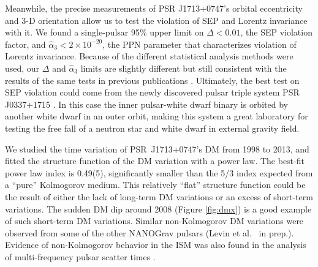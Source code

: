 
Meanwhile, the precise measurements of PSR J1713+0747's orbital eccentricity and
3-D orientation allow us to test the violation of SEP and 
Lorentz invariance with it. We found a single-pulsar 95\% upper limit on 
$\Delta <0.01$, the SEP violation factor, and
$\hat{\alpha}_3<2\times10^{-20}$, the PPN parameter that characterizes
violation of Lorentz invariance. 
Because of the different statistical analysis methods were used, our 
$\Delta$ and $\hat{\alpha}_3$ limits  are slightly
different but still consistent with the results of the same tests in previous publications 
\citep{wex00, sns+05, sfl+05, gsf+11}.
Ultimately, the best test on SEP violation could come from the newly
discovered pulsar triple system PSR J0337+1715 \citep{rsa+14}. In this case 
the inner pulsar-white dwarf binary is orbited by another white dwarf in an
outer orbit, making this system a great laboratory for testing
the free fall of a neutron star and white dwarf in external gravity field.

We studied the time variation of PSR~J1713+0747's DM from 1998 to 2013, and
fitted the structure function of the DM variation with a power law.  
The best-fit power law index is 0.49(5), significantly smaller than the 5/3 
index expected from a ``pure'' Kolmogorov medium. This relatively ``flat'' structure
function could be the result of either the lack of long-term DM variations or an
excess of short-term variations. The sudden DM dip around 2008 (Figure
\ref{fig:dmx}) is a good example of such short-term DM variations.
Similar non-Kolmogorov DM variations were observed from some of the
other NANOGrav pulsars (Levin et al. \ in prep.). Evidence of non-Kolmogorov behavior 
in the ISM was also found in the analysis of multi-frequency pulsar scatter times \citep{lkk15}.


